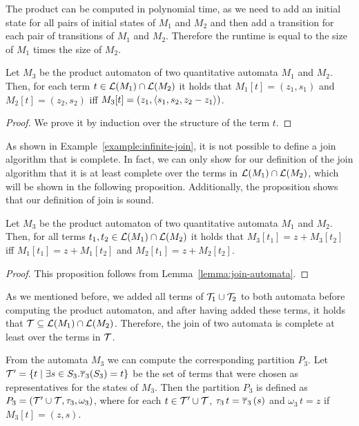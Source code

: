 The product can be computed in polynomial time, as we need to add an initial state for all pairs of initial states of $M_1$ and $M_2$ and then add a transition for each pair of transitions of $M_1$ and $M_2$. Therefore the runtime is equal to the size of $M_1$ times the size of $M_2$.

\begin{lemma}\label{lemma:join-automata}
    Let $M_3$ be the product automaton of two quantitative automata $M_1$ and $M_2$.
    Then, for each term $t \in \mathcal{L}(M_1) \cap \mathcal{L}(M_2)$ it holds that $M_1[t] = (z_1, s_1)$ and $M_2[t] = (z_2, s_2)$ iff $M_3[t] = (z_1, \langle s_1, s_2, z_2 - z_1\rangle)$.
\end{lemma}
\begin{proof}
    We prove it by induction over the structure of the term $t$.
\end{proof}

As shown in Example~\ref{example:infinite-join}, it is not possible to define a join algorithm that is complete.
In fact, we can only show for our definition of the join algorithm that it is at least complete over the terms in $\mathcal{L}(M_1) \cap \mathcal{L}(M_2)$, which will be shown in the following proposition.
Additionally, the proposition shows that our definition of join is sound.

\begin{proposition}\label{prop:join-automata}
    Let $M_3$ be the product automaton of two quantitative automata $M_1$ and $M_2$.
    Then, for all terms $t_1, t_2 \in \mathcal{L}(M_1) \cap \mathcal{L}(M_2)$ it holds that $M_3[t_1] = z + M_3[t_2]$ iff $M_1[t_1] = z + M_1[t_2]$ and $M_2[t_1] = z + M_2[t_2]$.
\end{proposition}
\begin{proof}
    This proposition follows from Lemma~\ref{lemma:join-automata}.
\end{proof}

As we mentioned before, we added all terms of $\mathcal{T}_1 \cup \mathcal{T}_2$ to both automata before computing the product automaton, and after having added these terms, it holds that $\mathcal{T} \subseteq \mathcal{L}(M_1) \cap \mathcal{L}(M_2)$.
Therefore, the join of two automata is complete at least over the terms in $\mathcal{T}$.

From the automata $M_3$ we can compute the corresponding partition $P_3$.
Let $\mathcal{T}' = \{t \mid \exists s \in S_3 . \overline{\tau}_3(S_3) = t\}$ be the set of terms that were chosen
as representatives for the states of $M_3$.
Then the partition $P_3$ is defined as $P_3 = (\mathcal{T}' \cup \mathcal{T}, \tau_3, \omega_3)$,
where for each $t \in \mathcal{T}' \cup \mathcal{T}$, $\tau_3\,t = \overline{\tau}_3\,(s)$ and $\omega_3\,t = z$ if $M_3[t] = (z,s)$.

